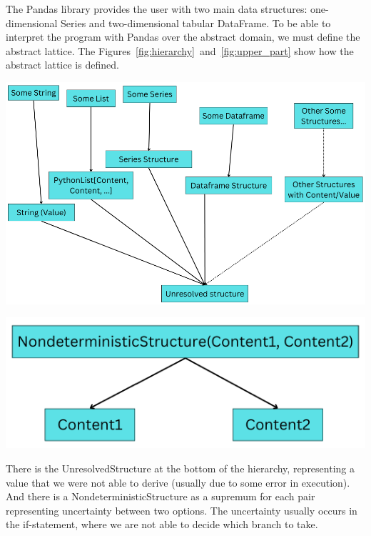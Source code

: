 \large
The Pandas library provides the user with two main data structures: one-dimensional Series
and two-dimensional tabular DataFrame.
To be able to interpret the program with Pandas over the abstract domain, we must define the abstract lattice.
The Figures~\ref{fig:hierarchy}~and~\ref{fig:upper_part} show how the abstract lattice is defined.

\begin{tikzfigure}
    \label{fig:hierarchy}
    \includegraphics[scale=0.8]{poster/img/hier}
\end{tikzfigure}

\begin{tikzfigure}
    \label{fig:upper_part}
    \includegraphics[scale=0.8]{poster/img/nondeterm}
\end{tikzfigure}

There is the UnresolvedStructure at the bottom of the hierarchy, representing a value that we were not
able to derive (usually due to some error in execution).
And there is a NondeterministicStructure as a supremum for each pair representing uncertainty between two options.
The uncertainty usually occurs in the if-statement, where we are not able to decide which branch to take.
